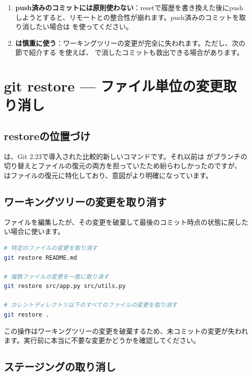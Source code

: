 \begin{enumerate}
  \item \textbf{push済みのコミットには原則使わない}：resetで履歴を書き換えた後にpushしようとすると、リモートとの整合性が崩れます。push済みのコミットを取り消したい場合は  を使ってください。
  \item \textbf{ は慎重に使う}：ワーキングツリーの変更が完全に失われます。ただし、次の節で紹介する  を使えば、 で消したコミットも救出できる場合があります。
\end{enumerate}

\section{git restore — ファイル単位の変更取り消し}

\subsection{restoreの位置づけ}

 は、Git 2.23で導入された比較的新しいコマンドです。それ以前は  がブランチの切り替えとファイルの復元の両方を担っていたため紛らわしかったのですが、 はファイルの復元に特化しており、意図がより明確になっています。

\subsection{ワーキングツリーの変更を取り消す}

ファイルを編集したが、その変更を破棄して最後のコミット時点の状態に戻したい場合に使います。

\begin{lstlisting}[language=bash]
# 特定のファイルの変更を取り消す
git restore README.md

# 複数ファイルの変更を一度に取り消す
git restore src/app.py src/utils.py

# カレントディレクトリ以下のすべてのファイルの変更を取り消す
git restore .
\end{lstlisting}

この操作はワーキングツリーの変更を破棄するため、未コミットの変更が失われます。実行前に本当に不要な変更かどうかを確認してください。

\subsection{ステージングの取り消し}

